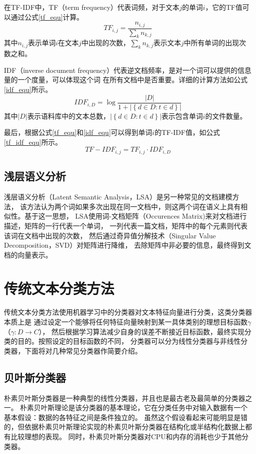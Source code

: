 在TF-IDF中，TF（term frequency）代表词频，对于文本$j$的单词$i$，它的TF值可以通过公式\ref{tf_equ}计算。
\begin{equation}
    TF_{i,j}=\frac{n_{i,j}}{\sum_k n_{k,j}}
    \label{tf_equ}
\end{equation}
其中$n_{i,j}$表示单词$i$在文本$j$中出现的次数，$\sum_k n_{k,j}$表示文本$j$中所有单词的出现次数之和。

IDF（inverse document frequency）代表逆文档频率，是对一个词可以提供的信息量的一个度量，可以体现这个词
在所有文档中是否重要。详细的计算方法如公式\ref{idf_equ}所示。
\begin{equation}
    IDF_{i,D}=\log \frac{\left | D \right |}{1+\left | \left \{ d\in D:t\in d \right \} \right |}
    \label{idf_equ}
\end{equation}
其中$\left | D \right |$表示语料库中的文本总数，$\left | \left \{ d\in D:t\in d \right \} \right |$表示包含单词$i$的文件数量。

最后，根据公式\ref{tf_equ}和\ref{idf_equ}可以得到单词$i$的TF-IDF值，如公式\ref{tf_idf_equ}所示。
\begin{equation}
    TF-IDF_{i,j}=TF_{i,j} \cdot IDF_{i,D}
    \label{tf_idf_equ}
\end{equation}

\subsection{浅层语义分析}
浅层语义分析（Latent Semantic Analysis，LSA）是另一种常见的文档建模方法，
该方法认为两个词如果多次出现在同一文档中，则这两个词在语义上具有相似性。基于这一思想，
LSA使用词-文档矩阵（Occurences Matrix)来对文档进行描述，矩阵的一行代表一个单词，
一列代表一篇文档，矩阵中的每个元素则代表该词在文档中出现的次数，
然后通过奇异值分解技术（Singular Value Decomposition，SVD）对矩阵进行降维，
去除矩阵中非必要的信息，最终得到文档的向量表示。


\section{传统文本分类方法}
传统文本分类方法使用机器学习中的分类器对文本特征向量进行分类，这类分类器本质上是
通过设定一个能够将任何特征向量映射到某一具体类别的理想目标函数$\gamma$（$\gamma :D\rightarrow C$），
然后根据学习算法减少自身的误差不断接近目标函数，最终实现分类的目的。按照设定的目标函数的不同，
分类器可以分为线性分类器与非线性分类器，下面将对几种常见分类器作简要介绍。
\subsection{贝叶斯分类器}
朴素贝叶斯分类器是一种典型的线性分类器，并且也是最古老及最简单的分类器之一。
朴素贝叶斯理论是该分类器的基本理论，它在分类任务中对输入数据有一个基本假设：数据的各特征之间是条件独立的。
虽然这个假设看起来可能明显是错的，但依据朴素贝叶斯理论实现的朴素贝叶斯分类器在结构化或半结构化数据上都有比较理想的表现。
同时，朴素贝叶斯分类器对CPU和内存的消耗也少于其他分类器。

